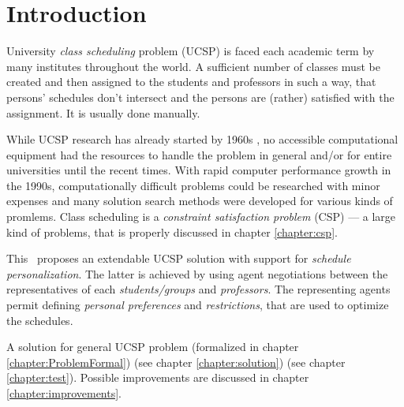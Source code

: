\documentclass[ThesisDoc]{subfiles}
\begin{document}
\chapter{Introduction}

University \emph{class scheduling} problem (UCSP) is faced each academic term
by many institutes throughout the world. A sufficient number of classes must
be created and then assigned to the students and professors in such a way,
that persons' schedules don't intersect and the persons are (rather) satisfied
with the assignment. It is usually done manually.

While UCSP research has already started by 1960s ,
no accessible computational equipment had the resources to handle the problem
in general and/or for entire universities until the recent times.
With rapid computer performance growth in the 1990s, computationally
difficult problems could be researched with minor expenses and many
solution search methods were developed for various kinds of promlems.
Class scheduling is a \emph{constraint satisfaction problem} (CSP) ---
a large kind of problems, that is properly discussed in chapter \ref{chapter:csp}.


\medskip

\noindent
This \thisdoc\ proposes an extendable UCSP solution with support for
\emph{schedule personalization}. The latter is achieved by using agent
negotiations between the representatives of each \emph{students/groups} and
\emph{professors}. The representing agents permit defining
\emph{personal preferences} and \emph{restrictions}, that are used to optimize
the schedules.

\medskip

\noindent
A solution for general UCSP problem
(formalized in chapter \ref{chapter:ProblemFormal}) 
(see chapter \ref{chapter:solution})  (see chapter \ref{chapter:test}).
Possible improvements are discussed in chapter \ref{chapter:improvements}.
\end{document}
